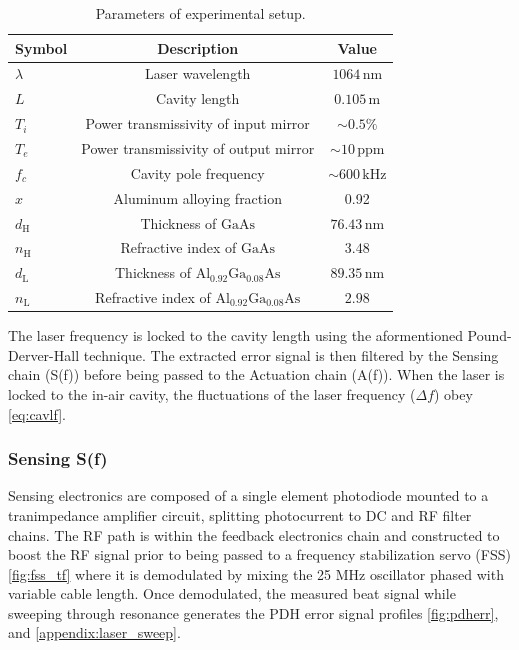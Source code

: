 \begin{table}[h!]
\caption{Parameters of experimental setup.}
\centering 
\begin{tabular}{lcc}
    \hline \hline
    Symbol & Description & Value \\
    \hline
    $\lambda$ & Laser wavelength & $1064 \, \mathrm{nm}$ \\
    $L$ & Cavity length & $0.105\, \mathrm{m}$ \\
    $T_i$ & Power transmissivity of input mirror & $\sim0.5\%$ \\
    $T_e$ & Power transmissivity of output mirror & $\sim10\, \mathrm{ppm}$ \\
    $f_c$ & Cavity pole frequency & $\sim600\, \mathrm{kHz}$ \\
    $x$ & Aluminum alloying fraction & 0.92 \\
    $d_{\mathrm{H}}$ & Thickness of $\mathrm{GaAs}$ & $76.43\, \mathrm{nm}$ \\
    $n_{\mathrm{H}}$ & Refractive index of $\mathrm{GaAs}$ & $3.48$ \\
    $d_{\mathrm{L}}$ & Thickness of $\mathrm{Al_{0.92}Ga_{0.08}As}$ & $89.35\, \mathrm{nm}$ \\
    $n_{\mathrm{L}}$ & Refractive index of $\mathrm{Al_{0.92}Ga_{0.08}As}$ & $2.98$ \\
    \hline \hline
\end{tabular} \label{table:cav_params}
\end{table}

The laser frequency is locked to the cavity length using the aformentioned Pound-Derver-Hall technique. The extracted error signal is then filtered by the Sensing chain (S(f)) before being passed to the Actuation chain (A(f)). When the laser is locked to the in-air cavity, the fluctuations of the laser frequency ($\Delta f$) obey \autoref{eq:cavlf}. 

\subsubsection{Sensing S(f)}
Sensing electronics are composed of a single element photodiode mounted to a tranimpedance amplifier circuit, splitting photocurrent to DC and RF filter chains. The RF path is within the feedback electronics chain and constructed to boost the RF signal prior to being passed to a frequency stabilization servo (FSS) \autoref{fig:fss_tf} where it is demodulated by mixing the 25 MHz oscillator phased with variable cable length. Once demodulated, the measured beat signal while sweeping through resonance generates the PDH error signal profiles \autoref{fig:pdherr}, and \autoref{appendix:laser_sweep}.

